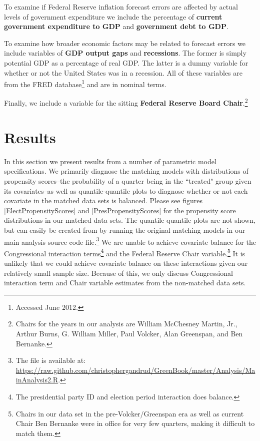 \documentclass[a4paper]{article}
\begin{document}
To examine if Federal Reserve inflation forecast errors are affected by actual levels of government expenditure we include the percentage of {\bf{current government expenditure to GDP}} and {\bf{government debt to GDP}}. 

To examine how broader economic factors may be related to forecast errors we include variables of {\bf{GDP output gaps}} and {\bf{recessions}}. The former is simply potential GDP as a percentage of real GDP. The latter is a dummy variable for whether or not the United States was in a recession. All of these variables are from the FRED database\footnote{Accessed June 2012.} and are in nominal terms. 

Finally, we include a variable for the sitting {\bf{Federal Reserve Board Chair}}.\footnote{Chairs for the years in our analysis are William McChesney Martin, Jr., Arthur Burns, G. William Miller, Paul Volcker, Alan Greenspan, and Ben Bernanke.}

\section{Results}

In this section we present results from a number of parametric model specifications. We primarily diagnose the matching models with distributions of propensity scores--the probability of a quarter being in the ``treated" group given its covariates--as well as quantile-quantile plots \citep{Ho2007} to diagnose whether or not each covariate in the matched data sets is balanced. Please see figures \ref{ElectPropensityScores} and \ref{PresPropensityScores} for the propensity score distributions in our matched data sets. The quantile-quantile plots are not shown, but can easily be created from by running the original matching models in our main analysis source code file.\footnote{The file is available at: \url{https://raw.github.com/christophergandrud/GreenBook/master/Analysis/MainAnalysis2.R}.}  We are unable to achieve covariate balance for the Congressional interaction terms\footnote{The presidential party ID and election period interaction does balance.} and the Federal Reserve Chair variable.\footnote{Chairs in our data set in the pre-Volcker/Greenspan era as well as current Chair Ben Bernanke were in office for very few quarters, making it difficult to match them.} It is unlikely that we could achieve covariate balance on these interactions given our relatively small sample size. Because of this, we only discuss Congressional interaction term and Chair variable estimates from the non-matched data sets.
\end{document}
